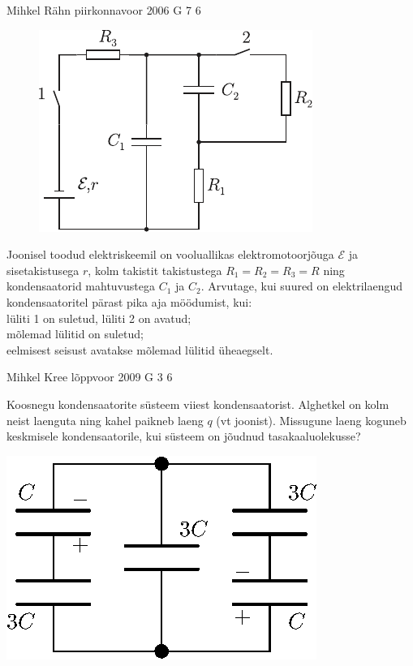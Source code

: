 \documentclass[11pt]{article}
\begin{document}
{%
{Mihkel Rähn} %
{piirkonnavoor} %
{2006} %
{G 7} %
{6} %
{
\ifStatement
\begin{figure}
	\begin{center}
		\vspace{-25pt}
		\includegraphics[width=\linewidth]{2006-v2g-07-yl}
	\end{center}
\end{figure}
Joonisel toodud elektriskeemil on vooluallikas elektromotoorjõuga $\mathcal E$ ja sisetakistusega $r$, kolm takistit takistustega $R_1 = R_2 = R_3 = R$ ning kondensaatorid mahtuvustega $C_1$ ja $C_2$. Arvutage, kui suured on elektrilaengud kondensaatoritel pärast pika aja möödumist, kui:\\
\osa lüliti 1 on suletud, lüliti 2 on avatud;\\
\osa mõlemad lülitid on suletud;\\
\osa eelmisest seisust avatakse mõlemad lülitid üheaegselt. 
\fi
}

{Mihkel Kree} %
{lõppvoor} %
{2009} %
{G 3} %
{6} %
{
\ifStatement
Koosnegu kondensaatorite süsteem viiest kondensaatorist. Alghetkel on kolm neist laenguta ning kahel paikneb laeng $q$ (vt joonist). Missugune laeng koguneb keskmisele kondensaatorile, kui süsteem on jõudnud tasakaaluolekusse?

\begin{center}
	\includegraphics[width=0.42\linewidth]{2009-v3g-03-G_kondensaatorid.eps}
\end{center}
\fi
}

}
\end{document}
